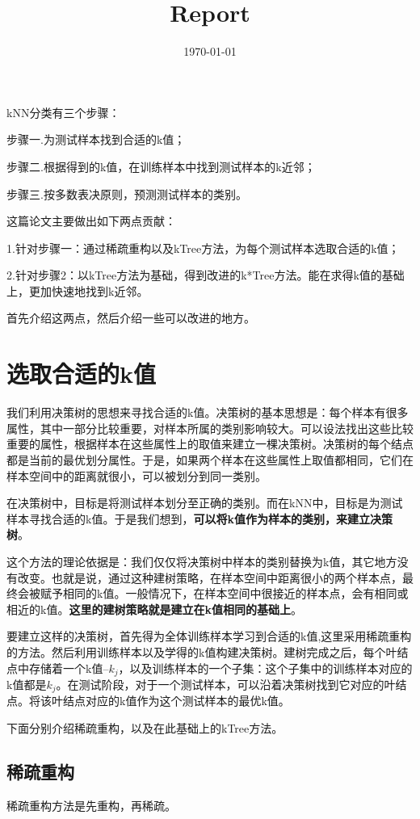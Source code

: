 \documentclass{ctexart}
\title{Report}
\date{\today}
\begin{document}
	\maketitle
	kNN分类有三个步骤：
	
	步骤一.为测试样本找到合适的k值；
	
	步骤二.根据得到的k值，在训练样本中找到测试样本的k近邻；
	
	步骤三.按多数表决原则，预测测试样本的类别。
	
	这篇论文主要做出如下两点贡献：
	
	1.针对步骤一：通过稀疏重构以及kTree方法，为每个测试样本选取合适的k值；
	
	2.针对步骤2：以kTree方法为基础，得到改进的k*Tree方法。能在求得k值的基础上，更加快速地找到k近邻。
	
	首先介绍这两点，然后介绍一些可以改进的地方。
	
	\section{选取合适的k值}
	我们利用决策树的思想来寻找合适的k值。决策树的基本思想是：每个样本有很多属性，其中一部分比较重要，对样本所属的类别影响较大。可以设法找出这些比较重要的属性，根据样本在这些属性上的取值来建立一棵决策树。决策树的每个结点都是当前的最优划分属性。于是，如果两个样本在这些属性上取值都相同，它们在样本空间中的距离就很小，可以被划分到同一类别。
	
	在决策树中，目标是将测试样本划分至正确的类别。而在kNN中，目标是为测试样本寻找合适的k值。于是我们想到，{\bfseries 可以将k值作为样本的类别，来建立决策树}。
	
	这个方法的理论依据是：我们仅仅将决策树中样本的类别替换为k值，其它地方没有改变。也就是说，通过这种建树策略，{在样本空间中距离很小的两个样本点，最终会被赋予相同的k值}。一般情况下，在样本空间中很接近的样本点，会有相同或相近的k值。{\bfseries 这里的建树策略就是建立在k值相同的基础上}。
	
	要建立这样的决策树，首先得为全体训练样本学习到合适的k值,这里采用稀疏重构的方法。然后利用训练样本以及学得的k值构建决策树。建树完成之后，每个叶结点中存储着一个k值--$ k_j $，以及训练样本的一个子集：这个子集中的训练样本对应的k值都是$ k_j $。在测试阶段，对于一个测试样本，可以沿着决策树找到它对应的叶结点。将该叶结点对应的k值作为这个测试样本的最优k值。
	
	下面分别介绍稀疏重构，以及在此基础上的kTree方法。
	\subsection{稀疏重构}
	稀疏重构方法是先重构，再稀疏。
\end{document}
